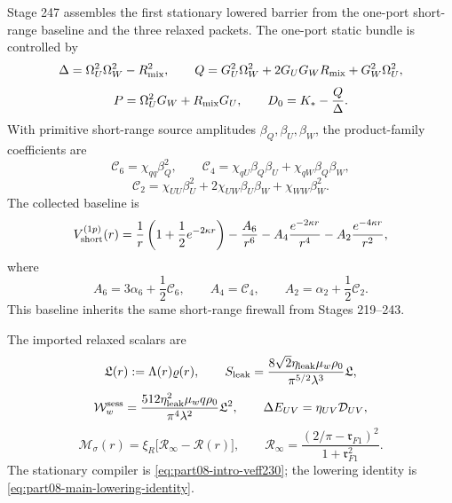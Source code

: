 Stage 247 assembles the first stationary lowered barrier from the one-port short-range baseline and the three relaxed packets.  The one-port static bundle is controlled by
\begin{equation}
\label{eq:part08-stage247-delta-q-p}
\Delta=\Omega_U^2\Omega_W^2-R_{\rm mix}^{2},
\qquad
Q=G_U^2\Omega_W^2+2G_UG_WR_{\rm mix}+G_W^2\Omega_U^2,
\end{equation}
\begin{equation}
\label{eq:part08-stage247-p-d0}
P=\Omega_U^2G_W+R_{\rm mix}G_U,
\qquad
D_0=K_*-\frac{Q}{\Delta}.
\end{equation}
With primitive short-range source amplitudes \(\beta_Q,\beta_U,\beta_W\), the product-family coefficients are
\begin{equation}
\label{eq:part08-stage247-c6c4c2}
\mathcal C_6=\chi_{qq}\beta_Q^2,
\qquad
\mathcal C_4=\chi_{qU}\beta_Q\beta_U+\chi_{qW}\beta_Q\beta_W,
\end{equation}
\begin{equation}
\label{eq:part08-stage247-c2}
\mathcal C_2=\chi_{UU}\beta_U^2+2\chi_{UW}\beta_U\beta_W+\chi_{WW}\beta_W^2.
\end{equation}
The collected baseline is
\begin{equation}
\label{eq:part08-stage247-vshort}
V_{\rm short}^{(1p)}(r)
=
\frac1r\left(1+\frac12e^{-2\kappa r}\right)
-
\frac{A_6}{r^6}
-
A_4\frac{e^{-2\kappa r}}{r^4}
-
A_2\frac{e^{-4\kappa r}}{r^2},
\end{equation}
where
\begin{equation}
\label{eq:part08-stage247-a6a4a2}
A_6=3\alpha_6+\frac12\mathcal C_6,
\qquad
A_4=\mathcal C_4,
\qquad
A_2=\alpha_2+\frac12\mathcal C_2.
\end{equation}
This baseline inherits the same short-range firewall from Stages 219--243.

The imported relaxed scalars are
\begin{equation}
\label{eq:part08-stage247-lag-l}
\mathfrak L(r):=\Lambda(r)\varrho(r),
\qquad
S_{\rm leak}=\frac{8\sqrt2\eta_{\rm leak}\mu_w\rho_0}{\pi^{5/2}\lambda^3}\mathfrak L,
\end{equation}
\begin{equation}
\label{eq:part08-stage247-work}
\mathcal W_w^{\rm sess}
=
\frac{512\eta_{\rm leak}^{2}\mu_wq\rho_0}{\pi^4\lambda^2}\mathfrak L^2,
\qquad
\Delta E_{UV}=\eta_{UV}\mathcal D_{UV},
\end{equation}
\begin{equation}
\label{eq:part08-stage247-source-lowering}
\mathcal M_\sigma(r)=\xi_R\bigl[\mathcal R_\infty-\mathcal R(r)\bigr],
\qquad
\mathcal R_\infty=\frac{(2/\pi-\mathfrak r_{F1})^2}{1+\mathfrak r_{F1}^2}.
\end{equation}
The stationary compiler is \cref{eq:part08-intro-veff230}; the lowering identity is \cref{eq:part08-main-lowering-identity}.

